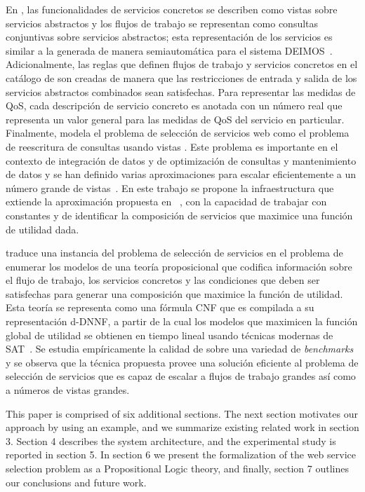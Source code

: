 En \mcdsatc, las funcionalidades de servicios concretos se describen
como vistas sobre servicios abstractos y los flujos de trabajo se representan
como consultas conjuntivas sobre servicios abstractos; esta representación de
los servicios es similar a la generada de manera semiautomática para el
sistema {\cal DEIMOS}~\cite{AmbiteISWC09}. Adicionalmente, las reglas
que definen flujos de trabajo y servicios concretos en el catálogo de
\mcdsatc son creadas de manera que las restricciones de entrada y salida
de los servicios abstractos combinados sean satisfechas. Para representar las
medidas de QoS, cada descripción de servicio concreto es anotada con un número
real que representa un valor general para las medidas de QoS del servicio en
particular. Finalmente, \mcdsatc modela el problema de selección de
servicios web como el problema de reescritura de consultas usando vistas
\cite{halevy:survey}. Este problema es importante en el contexto de integración
de datos \cite{Chen05,JaudoinPRST05} y de optimización de consultas y
mantenimiento de datos \cite{AfratiLU07,levy:bucket} y se han definido varias
aproximaciones para escalar eficientemente a un número grande de
vistas~\cite{arvelo:aaai06,pods:DuschkaG97,sac:DuschkaG97,levy:bucket,pottinger:minicon}.
En este trabajo se propone la infraestructura \mcdsatc que extiende la
aproximación propuesta en  ~\cite{arvelo:aaai06}, con la capacidad de trabajar
con constantes y de identificar la composición de servicios que maximice una
función de utilidad dada.

\mcdsatc  traduce una instancia del problema de selección de servicios
en el problema de enumerar los modelos de una teoría proposicional que codifica
información sobre el flujo de trabajo, los servicios concretos y las condiciones
que deben ser satisfechas para generar una composición que maximice la función
de utilidad. Esta teoría se representa como una fórmula CNF que es compilada a
su representación d-DNNF, a partir de la cual los modelos que maximicen la
función global de utilidad se obtienen en tiempo lineal usando técnicas modernas
de SAT~\cite{darwiche:dnnf}. Se estudia empíricamente la calidad de \mcdsatc
sobre una variedad de \emph{benchmarks} y se observa que la técnica
propuesta provee una solución eficiente al problema de selección de servicios
que es capaz de escalar a flujos de trabajo grandes así como a números de vistas
grandes.

This paper is comprised of six additional sections. The next section motivates
our approach by using an example, and  we summarize existing related work in
section 3. Section 4 describes the \mcdsatc system architecture, and  the experimental study is reported in section 5. 
In section 6 we present the formalization of the web service selection problem as a Propositional Logic theory, and finally, section 7 outlines our conclusions and future work.

